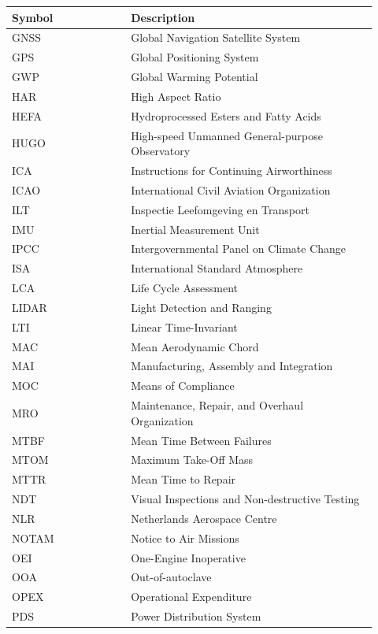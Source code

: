 \hfill
\begin{minipage}[t]{0.31\textwidth}
\begin{tabular}{@{}%
>{\raggedright\arraybackslash}p{0.30\linewidth}
>{\raggedright\arraybackslash}p{0.62\linewidth}@{}}
\toprule
\textbf{Symbol} & \textbf{Description} \\
\midrule
GNSS   & Global Navigation Satellite System \\
GPS    & Global Positioning System \\
GWP    & Global Warming Potential \\
HAR    & High Aspect Ratio \\
HEFA   & Hydroprocessed Esters and Fatty Acids \\
HUGO   & High-speed Unmanned General-purpose Observatory \\
ICA    & Instructions for Continuing Airworthiness \\
ICAO   & International Civil Aviation Organization \\
ILT    & Inspectie Leefomgeving en Transport \\
IMU    & Inertial Measurement Unit \\
IPCC   & Intergovernmental Panel on Climate Change \\
ISA    & International Standard Atmosphere \\
LCA    & Life Cycle Assessment \\
LIDAR  & Light Detection and Ranging \\
LTI    & Linear Time-Invariant \\
MAC    & Mean Aerodynamic Chord \\
MAI    & Manufacturing, Assembly and Integration \\
MOC    & Means of Compliance \\
MRO    & Maintenance, Repair, and Overhaul Organization \\
MTBF   & Mean Time Between Failures \\
MTOM   & Maximum Take-Off Mass \\
MTTR   & Mean Time to Repair \\
NDT    & Visual Inspections and Non-destructive Testing \\
NLR    & Netherlands Aerospace Centre \\
NOTAM  & Notice to Air Missions \\
OEI    & One-Engine Inoperative \\
OOA    & Out-of-autoclave \\
OPEX   & Operational Expenditure \\
PDS    & Power Distribution System \\
\bottomrule
\end{tabular}
\end{minipage}
